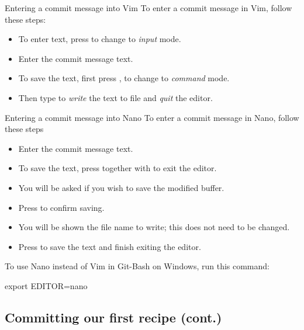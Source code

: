 \documentclass{git_course}
\begin{document}
\begin{frame}[fragile]{Entering a commit message into Vim}
    To enter a commit message in Vim, follow these steps:
    \begin{itemize}
        \item To enter text, press  to change to \emph{input} mode.
        \item Enter the commit message text.
        \item To save the text, first press , to change to
            \emph{command} mode.
        \item Then type  to \emph{write} the text to file and
            \emph{quit} the editor.
    \end{itemize}
\end{frame}

\begin{frame}[fragile]{Entering a commit message into Nano}
    To enter a commit message in Nano, follow these steps
    \begin{itemize}
        \item Enter the commit message text.
        \item To save the text, press  together with  to
            exit the editor.
        \item You will be asked if you wish to save the modified buffer.
        \item Press  to confirm saving.
        \item You will be shown the file name to write; this does not need
            to be changed.
        \item Press  to save the text and finish exiting the
            editor.
    \end{itemize}

    To use Nano instead of Vim in Git-Bash on Windows, run this command:
    \begin{shellcode}
        export EDITOR=nano
    \end{shellcode}
\end{frame}

\subsection{Committing our first recipe (cont.)}
\end{document}
